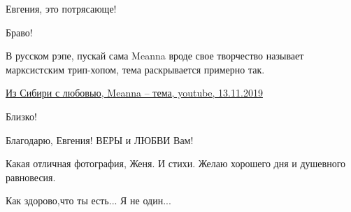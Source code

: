 \begin{itemize}
 
Евгения, это потрясающе!

 
Браво!

 
В русском рэпе, пускай сама Meanna вроде свое творчество называет марксистским
трип-хопом, тема раскрывается примерно так.

\href{https://www.youtube.com/watch?v=pM8osrUKUAc}{%
Из Сибири с любовью, Meanna – тема, youtube, 13.11.2019%
%
}

 
Близко!

 
Благодарю, Евгения! ВЕРЫ и ЛЮБВИ Вам!

 
Какая отличная фотография, Женя. И стихи. Желаю хорошего дня и душевного равновесия.

 
Как здорово,что ты есть... Я не один...

\end{itemize}

